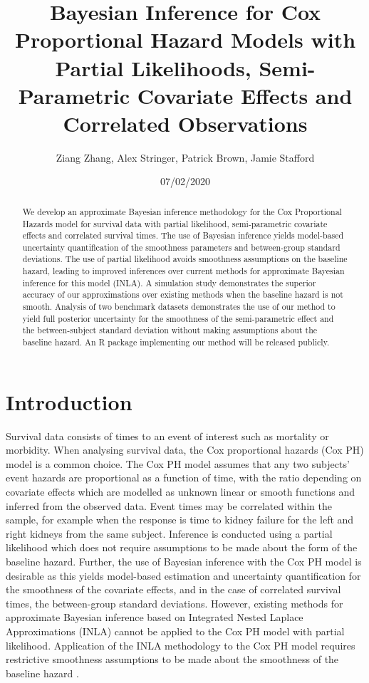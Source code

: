\documentclass[]{article}
\title{{\myfont Bayesian Inference for Cox Proportional Hazard Models with Partial Likelihoods, Semi-Parametric Covariate Effects and Correlated Observations}}
\date{07/02/2020}
\author{Ziang Zhang, Alex Stringer, Patrick Brown, Jamie Stafford}
\begin{document}
	
\maketitle

\begin{abstract}
We develop an approximate Bayesian inference methodology for the Cox Proportional Hazards model for survival data with partial likelihood, semi-parametric covariate effects and correlated survival times. The use of Bayesian inference yields model-based uncertainty quantification of the smoothness parameters and between-group standard deviations. The use of partial likelihood avoids smoothness assumptions on the baseline hazard, leading to improved inferences over current methods for approximate Bayesian inference for this model (INLA). A simulation study demonstrates the superior accuracy of our approximations over existing methods when the baseline hazard is not smooth. Analysis of two benchmark datasets demonstrates the use of our method to yield full posterior uncertainty for the smoothness of the semi-parametric effect and the between-subject standard deviation without making assumptions about the baseline hazard. An R package implementing our method will be released publicly.
\end{abstract}


\section{Introduction}
Survival data consists of times to an event of interest such as mortality or morbidity.  When analysing survival data, the Cox proportional hazards (Cox PH) model is a common choice. The Cox PH model assumes that any two subjects' event hazards are proportional as a function of time, with the ratio depending on covariate effects which are modelled as unknown linear or smooth functions and inferred from the observed data. Event times may be correlated within the sample, for example when the response is time to kidney failure for the left and right kidneys from the same subject. Inference is conducted using a partial likelihood which does not require assumptions to be made about the form of the baseline hazard.  Further, the use of Bayesian inference with the Cox PH model is desirable as this yields model-based estimation and uncertainty quantification for the smoothness of the covariate effects, and in the case of correlated survival times, the between-group standard deviations. However, existing methods for approximate Bayesian inference based on Integrated Nested Laplace Approximations (INLA) \citet{inla} cannot be applied to the Cox PH model with partial likelihood. Application of the INLA methodology to the Cox PH model requires restrictive smoothness assumptions to be made about the smoothness of the baseline hazard \citep{inlacoxph}.
\end{document}
